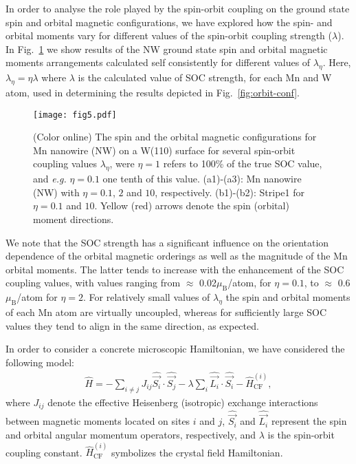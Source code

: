 \documentclass[prl,final,twocolumn]{revtex4-1}
\begin{document}
In order to analyse the role played by the spin-orbit coupling on the ground state spin and orbital magnetic configurations, we have explored how the spin- and orbital moments vary for different values of the spin-orbit coupling strength ($\lambda$).
% 
In Fig.~\ref{fig:fig-soc} we show results of the NW ground state spin and orbital magnetic moments arrangements calculated self consistently for different values of $\lambda_{\eta}$. Here, $\lambda_{\eta} = \eta \lambda$ where $\lambda$ is the calculated value of SOC strength, for each Mn and W atom, used in determining the results depicted in Fig.~\ref{fig:orbit-conf}. 
\begin{figure}[htp]
\centering
\texttt{[image: fig5.pdf]}
\caption{(Color online) The spin and the orbital magnetic configurations for Mn nanowire  (NW) on a W(110) surface for several  spin-orbit coupling values $\lambda_{\eta}$, were $\eta=1$ refers to 100\% of the true SOC value, and {\it e.g.} $\eta=0.1$ one tenth of this value.
(a1)-(a3): Mn nanowire (NW) with $\eta=0.1$, $2$ and $10$, respectively. (b1)-(b2): Stripe1 for $\eta=0.1$ and $10$.
Yellow (red) arrows denote the spin (orbital) moment  directions.
}
\label{fig:fig-soc}
\end{figure}
% 
We note that the SOC strength has a significant influence on the orientation dependence of the orbital magnetic orderings as well as the magnitude of the Mn orbital moments. 
The latter tends to increase with the enhancement of the SOC coupling values, with values ranging from $\approx$ 0.02$\mu_\text{B}$/atom,  for  $\eta=0.1$,  to $\approx$ 0.6$\mu_\text{B}$/atom  for $\eta=2$.
For relatively small values of $\lambda_{\eta}$ the spin and orbital moments of each Mn atom are virtually uncoupled, whereas for sufficiently large SOC values they tend to align in the same direction, as expected.
% 

In order to consider a concrete microscopic Hamiltonian, we have considered the following model:
\begin{eqnarray}
\hat H = - \sum_{i \ne j} J_{ij} \hat{ \vec{S_i}} \cdot \hat{ \vec{S_j}} - \lambda \sum_{i} \hat{ \vec{L_i}} \cdot \hat{ \vec {S_i}} - \hat H^{(i)}_{\mathrm{CF}}, 
\label{eq-model}
\end{eqnarray}
where $J_{ij}$ denote the effective Heisenberg (isotropic) exchange interactions between magnetic moments located on sites $i$ and $j$, $\hat{ \vec{S_i}}$ and $\hat{ \vec{L_i}}$ represent the spin and orbital angular momentum operators, respectively, and $\lambda$ is the spin-orbit coupling constant. $\hat H^{(i)}_{\mathrm{CF}}$ symbolizes the crystal field Hamiltonian. 
\end{document}
